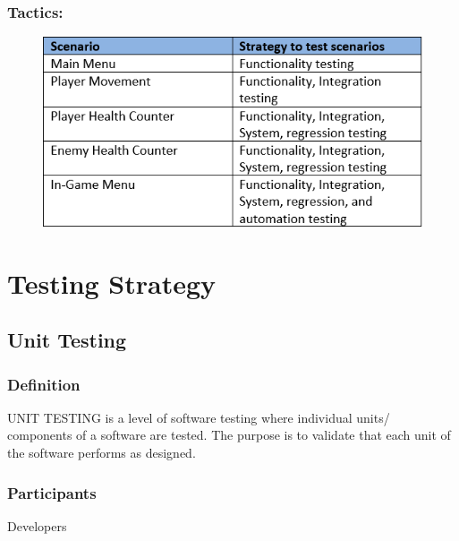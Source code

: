 \documentclass{article}
\begin{document}
\subsubsection{Tactics:}
\begin{figure}
    \centering
    \includegraphics[scale=0.9]{./images/tactics.PNG}
\end{figure}

\newpage

\section{Testing Strategy}

\subsection{Unit Testing}
\subsubsection{Definition}
UNIT TESTING is a level of software testing where individual units/ components of a software are tested. The purpose is to validate that each unit of the software performs as designed.\cite{UT}
\subsubsection{Participants}
Developers
\end{document}

